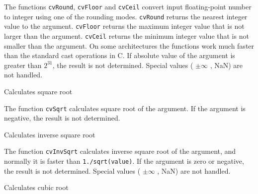 The functions \texttt{cvRound}, \texttt{cvFloor} and \texttt{cvCeil}
convert input floating-point number to integer using one of the rounding
modes. \texttt{cvRound} returns the nearest integer value to the
argument. \texttt{cvFloor} returns the maximum integer value that is not
larger than the argument. \texttt{cvCeil} returns the minimum integer
value that is not smaller than the argument. On some architectures the
functions work much faster than the standard cast
operations in C. If absolute value of the argument is greater than
$2^{31}$, the result is not determined. Special values ( $ \pm \infty$ , NaN)
are not handled.

\label{Sqrt}

Calculates square root


\begin{description}
\end{description}


The function \texttt{cvSqrt} calculates square root of the argument. If the argument is negative, the result is not determined.

\label{InvSqrt}

Calculates inverse square root


\begin{description}
\end{description}


The function \texttt{cvInvSqrt} calculates inverse square root of the argument, and normally it is faster than \texttt{1./sqrt(value)}. If the argument is zero or negative, the result is not determined. Special values ( $ \pm \infty $ , NaN) are not handled.

\label{Cbrt}

Calculates cubic root


\begin{description}
\end{description}


